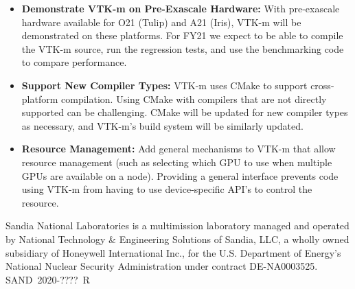 \begin{itemize}
\item \textbf{Demonstrate VTK-m on Pre-Exascale Hardware:}
  With pre-exascale hardware available for O21 (Tulip) and A21 (Iris), VTK-m will be demonstrated on these platforms.
  For FY21 we expect to be able to compile the VTK-m source, run the regression tests, and use the benchmarking code to compare performance.
\item \textbf{Support New Compiler Types:}
  VTK-m uses CMake to support cross-platform compilation.
  Using CMake with compilers that are not directly supported can be challenging.
  CMake will be updated for new compiler types as necessary, and VTK-m's build system will be similarly updated.
\item \textbf{Resource Management:}
  Add general mechanisms to VTK-m that allow resource management (such as selecting which GPU to use when multiple GPUs are available on a node).
  Providing a general interface prevents code using VTK-m from having to use device-specific API's to control the resource.
\end{itemize}

\noindent
{\tiny Sandia National Laboratories is a multimission laboratory managed and operated by National Technology \& Engineering Solutions of Sandia, LLC, a wholly owned subsidiary of Honeywell International Inc., for the U.S. Department of Energy's National Nuclear Security Administration under contract DE-NA0003525. \hfill SAND~2020-????~R
\par}
